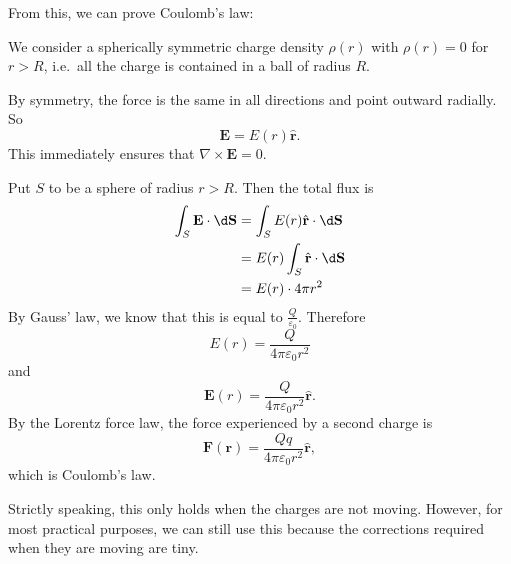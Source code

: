 \documentclass[a4paper]{article}
\begin{document}
From this, we can prove Coulomb's law:
\begin{eg}
  We consider a spherically symmetric charge density $\rho (r)$ with $\rho (r) = 0$ for $r > R$, i.e.\ all the charge is contained in a ball of radius $R$.
  \begin{center}
  \end{center}
  By symmetry, the force is the same in all directions and point outward radially. So
  \[
    \mathbf{E} = E(r) \hat{\mathbf{r}}.
  \]
  This immediately ensures that $\nabla \times \mathbf{E} = 0$.

  Put $S$ to be a sphere of radius $r > R$. Then the total flux is
  \begin{align*}
    \int_S \mathbf{E}\cdot \d \mathbf{S} &= \int_S E(r) \hat{\mathbf{r}}\cdot \d \mathbf{S}\\
    &= E(r) \int_S \hat{\mathbf{r}}\cdot \d \mathbf{S}\\
    &= E(r)\cdot 4\pi r^2
  \end{align*}
  By Gauss' law, we know that this is equal to $\frac{Q}{\varepsilon_0}$. Therefore
  \[
    E(r) = \frac{Q}{4\pi \varepsilon_0 r^2}
  \]
  and
  \[
    \mathbf{E}(r) = \frac{Q}{4\pi\varepsilon_0 r^2}\hat{\mathbf{r}}.
  \]
  By the Lorentz force law, the force experienced by a second charge is
  \[
    \mathbf{F}(\mathbf{r}) = \frac{Qq}{4\pi\varepsilon_0 r^2}\hat{\mathbf{r}},
  \]
  which is Coulomb's law.

  Strictly speaking, this only holds when the charges are not moving. However, for most practical purposes, we can still use this because the corrections required when they are moving are tiny.
\end{eg}
\end{document}
